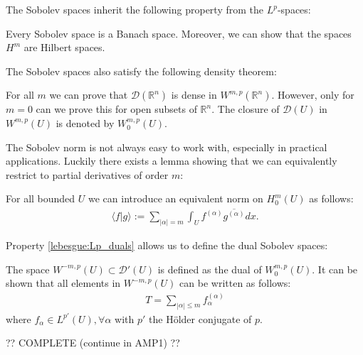 
    The Sobolev spaces inherit the following property from the $L^p$-spaces:
    \begin{property}
        Every Sobolev space is a Banach space. Moreover, we can show that the spaces $H^m$ are Hilbert spaces.
    \end{property}
    The Sobolev spaces also satisfy the following density theorem:
    \begin{property}
        For all $m$ we can prove that $\mathcal{D}(\mathbb{R}^n)$ is dense in $W^{m,p}(\mathbb{R}^n)$. However, only for $m=0$ can we prove this for open subsets of $\mathbb{R}^n$. The closure of $\mathcal{D}(U)$ in $W^{m,p}(U)$ is denoted by $W_0^{m,p}(U)$.
    \end{property}

    The Sobolev norm is not always easy to work with, especially in practical applications. Luckily there exists a lemma showing that we can equivalently restrict to partial derivatives of order $m$:
    \begin{theorem}[Friedrich]
        For all bounded $U$ we can introduce an equivalent norm on $H^m_0(U)$ as follows:
        \begin{gather}
            \langle f|g \rangle := \sum_{|\alpha|=m}\int_U f^{(\alpha)}\overline{g^{(\alpha)}}dx.
        \end{gather}
    \end{theorem}

    Property \ref{lebesgue:Lp_duals} allows us to define the dual Sobolev spaces:
    \begin{definition}
        The space $W^{-m, p}(U)\subset\mathcal{D}'(U)$ is defined as the dual of $W^{m, p}_0(U)$. It can be shown that all elements in $W^{-m, p}(U)$ can be written as follows:
        \begin{gather}
            T = \sum_{|\alpha|\leq m}f^{(\alpha)}_\alpha
        \end{gather}
        where $f_\alpha\in L^{p'}(U),\forall\alpha$ with $p'$ the H\"older conjugate of $p$.
    \end{definition}

    ?? COMPLETE (continue in AMP1) ??